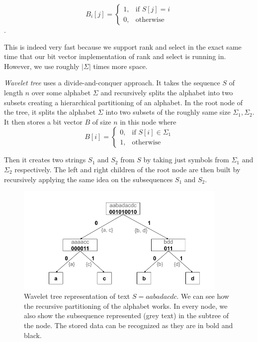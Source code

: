 \[
    B_i[j]= 
\begin{cases}
	1,& \text{if } S[j]=i \\
    0,& \text{otherwise}
\end{cases}
\].

This is indeed very fast because we support rank and select in the exact same time
that our bit vector implementation of rank and select is running in. However, we use
roughly $|\Sigma|$ times more space.

\textit{Wavelet tree} uses a divide-and-conquer approach. It takes the sequence $S$ of
length $n$ over some alphabet $\Sigma$ and recursively splits the alphabet into
two subsets creating a hierarchical partitioning of an alphabet. In the root node
of the tree, it splits the alphabet $\Sigma$ into two subsets of the roughly same
size $\Sigma_1, \Sigma_2$. It then stores a bit vector $B$ of size $n$ in this node
where
\[
    B[i]= 
\begin{cases}
    0,& \text{if } S[i]\in \Sigma_1\\
    1,              & \text{otherwise}
\end{cases}
\]

Then it creates two strings $S_1$ and $S_2$ from $S$ by taking just symbols
from $\Sigma_1$ and $\Sigma_2$ respectively. The left and right children of the root node
are then built by recursively applying the same idea on the subsequences $S_1$ and $S_2$.

\begin{figure}
	\centerline{
		\includegraphics[width=0.9\textwidth, height=0.3\textheight]{images/wavelet_tree}
	}
	\caption[TODO]{Wavelet tree representation of text $S=\mathit{aabadacdc}$. We can see how
	the recursive partitioning of the alphabet works. In every node, we also show the
	subsequence represented (grey text) in the subtree of the node. The stored data can be
	recognized as they are in bold and black.
	}
	\label{obr:WaveletTreeExample}
\end{figure}

